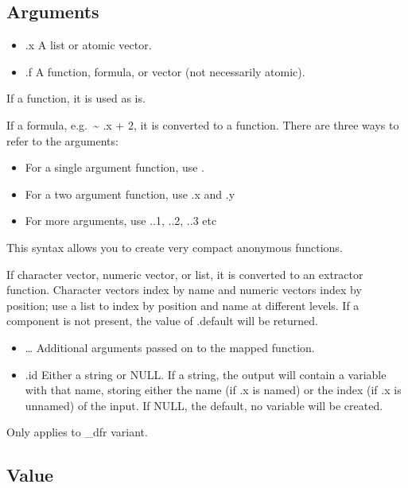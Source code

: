 \documentclass[
]{book}
\begin{document}
\hypertarget{arguments}{%
\subsection{Arguments}\label{arguments}}

\begin{itemize}
\item
  .x A list or atomic vector.
\item
  .f A function, formula, or vector (not necessarily atomic).
\end{itemize}

If a function, it is used as is.

If a formula, e.g.~\textasciitilde{} .x + 2, it is converted to a function. There are three ways to refer to the arguments:

\begin{itemize}
\item
  For a single argument function, use .
\item
  For a two argument function, use .x and .y
\item
  For more arguments, use ..1, ..2, ..3 etc
\end{itemize}

This syntax allows you to create very compact anonymous functions.

If character vector, numeric vector, or list, it is converted to an extractor function. Character vectors index by name and numeric vectors index by position; use a list to index by position and name at different levels. If a component is not present, the value of .default will be returned.

\begin{itemize}
\item
  \ldots{} Additional arguments passed on to the mapped function.
\item
  .id Either a string or NULL. If a string, the output will contain a variable with that name, storing either the name (if .x is named) or the index (if .x is unnamed) of the input. If NULL, the default, no variable will be created.
\end{itemize}

Only applies to ⁠\_dfr⁠ variant.

\hypertarget{value}{%
\subsection{Value}\label{value}}
\end{document}
